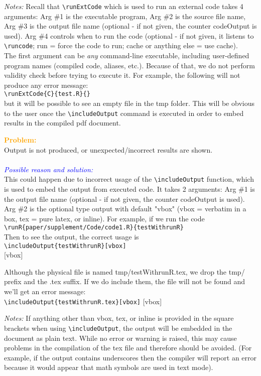 \documentclass[a4paper,10pt]{article}
\newcommand{\prob}[1] {\bigskip\noindent\textbf{\textcolor{orange}{Problem:}}\\#1\\\\}
\newcommand{\cause}[1] {\noindent\textit{\textcolor{blue}{Possible reason and solution:}}\\#1}
\newcommand{\cmnt}[1] {\bigskip\noindent\textit{Notes:} #1}
\begin{document}
\cmnt\bgroup
Recall that \verb|\runExtCode| which is used to run an external code takes 4 arguments:
Arg \#1 is the executable program,
Arg \#2 is the source file name,
Arg \#3 is the output file name (optional - if not given, the counter 
        codeOutput is used).
Arg \#4 controls when to run the code (optional - if not given, it listens
        to \verb|\runcode|; run = force the code to run; cache or anything else =
        use cache).\\
The first argument can be \textit{any} command-line executable, including user-defined program names (compiled code, aliases, etc.). Because of that, we do not perform validity check before trying to execute it.
For example, the following will not produce any error message:\\
\verb|\runExtCode{C}{test.R}{}|\\
but it will be possible to see an empty file in the tmp folder. This will be obvious to the user once the \verb|\includeOutput| command is executed in order to embed results in the compiled pdf document.
\egroup




\prob{Output is not produced, or unexpected/incorrect results are shown.}
\cause\bgroup
This could happen due to incorrect usage of the \verb|\includeOutput| function, which is used to embed the output from executed code. It takes 2 arguments:
Arg \#1 is the output file name (optional - if not given, the counter codeOutput is used).
Arg \#2 is the optional type output with default "vbox" (vbox = verbatim in a box, tex = pure latex, or inline).
For example, if we run the code\\
\verb|\runR{paper/supplement/Code/code1.R}{testWithrunR}|
\\
\noindent
Then to see the output, the correct usage is\\
\verb|\includeOutput{testWithrunR}[vbox]|\\
[vbox]

\noindent Although the physical file is named tmp/testWithrunR.tex, we drop the tmp/ prefix and the .tex suffix. If we do include them, the file will not be found and we'll get an error message:\\
\verb|\includeOutput{testWithrunR.tex}[vbox]|
[vbox]
\egroup

\cmnt\bgroup
If anything other than vbox, tex, or inline is provided in the square brackets when using \verb|\includeOutput|, the output will be embedded in the document as plain text. While no error or warning is raised, this may cause problems in the compilation of the tex file and therefore should be avoided. (For example, if the output contains underscores then the compiler will report an error because it would appear that math symbols are used in text mode).\\
\egroup
\end{document}
